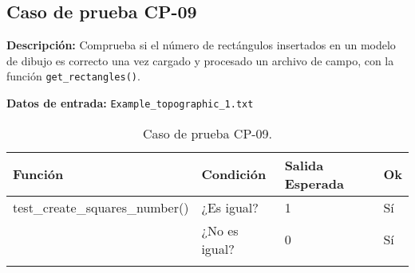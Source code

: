 \subsection{Caso de prueba CP-09}

\textbf{Descripción:} Comprueba si el número de rectángulos insertados en un modelo de dibujo es correcto una vez cargado y procesado un archivo de campo, con la función \texttt{get\_rectangles()}.

\textbf{Datos de entrada:} \texttt{Example\_topographic\_1.txt}


\begin{longtable}[]{@{}llll@{}}
\toprule
\begin{minipage}[b]{0.6\columnwidth}\raggedright\strut
Función\strut
\end{minipage} & \begin{minipage}[b]{0.20\columnwidth}\raggedright\strut
Condición\strut
\end{minipage} & \begin{minipage}[b]{0.15\columnwidth}\raggedright\strut
Salida Esperada\strut
\end{minipage} & \begin{minipage}[b]{0.05\columnwidth}\raggedright\strut
Ok\strut
\end{minipage}\tabularnewline
\midrule
\endhead
\begin{minipage}[t]{0.6\columnwidth}\raggedright\strut
\small{test\_create\_squares\_number()}\strut
\end{minipage} & \begin{minipage}[t]{0.20\columnwidth}\raggedright\strut
¿Es igual?\strut
\end{minipage} & \begin{minipage}[t]{0.15\columnwidth}\raggedright\strut
1\strut
\end{minipage} & \begin{minipage}[t]{0.05\columnwidth}\raggedright\strut
Sí\strut
\end{minipage}\tabularnewline
\begin{minipage}[t]{0.6\columnwidth}\raggedright\strut
\strut
\end{minipage} & \begin{minipage}[t]{0.20\columnwidth}\raggedright\strut
¿No es igual?\strut
\end{minipage} & \begin{minipage}[t]{0.15\columnwidth}\raggedright\strut
0\strut
\end{minipage} & \begin{minipage}[t]{0.05\columnwidth}\raggedright\strut
Sí\strut
\end{minipage}\tabularnewline

\bottomrule
\caption{Caso de prueba CP-09.}
\end{longtable}

